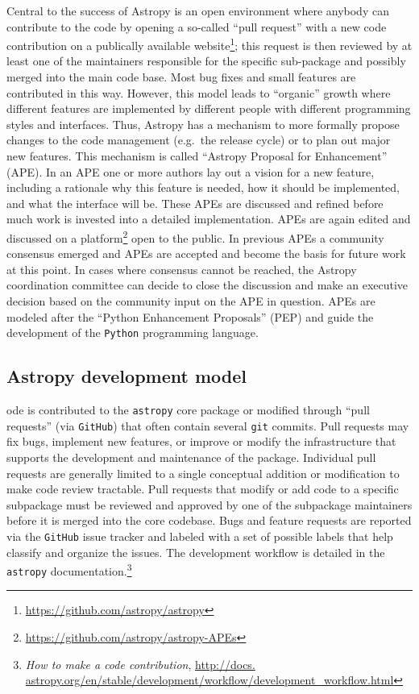 \documentclass[modern]{aastex61}
\newcommand{\package}[1]{\texttt{#1}\xspace}
\newcommand{\github}{\package{GitHub}}
\newcommand{\python}{\package{Python}}
\newcommand{\astropy}{Astropy\xspace}
\newcommand{\astropypkg}{\package{astropy}}
\newcommand{\inlinecomment}[2]{\todo[inline]{#1: #2}\xspace}
\begin{document}
Central to the success of \astropy is an open environment where
anybody can contribute to the code by opening a so-called ``pull
request'' with a new code contribution on a publically available
website\footnote{\url{https://github.com/astropy/astropy}}; this
request is then reviewed by at least one of the maintainers responsible for the specific
sub-package and possibly merged into the main code base. Most bug
fixes and small features are contributed in this way. However, this
model leads to ``organic'' growth where different features are
implemented by different people with different programming styles and
interfaces. Thus, \astropy has a mechanism to more formally propose
changes to the code management (e.g.~the release cycle) or to plan
out major new features. This mechanism is called ``Astropy Proposal
for Enhancement'' (APE). In an APE one or more authors lay out a
vision for a new feature, including a rationale why this feature is
needed, how it should be implemented, and what the interface will
be. These APEs are discussed and refined before much work is invested
into a detailed implementation. APEs are again edited and discussed on
a platform\footnote{\url{https://github.com/astropy/astropy-APEs}}
open to the public. In previous APEs a community consensus emerged and
APEs are accepted and become the basis for future work at this
point. In cases where consensus cannot be reached, the
\astropy coordination committee can decide to close the discussion and
make an executive decision based on the community input on the APE in
question. APEs are modeled after the ``Python Enhancement Proposals''
(PEP) and guide the development of the \python programming language.


\subsection{Astropy development model}
\inlinecomment{Adrian started this, but needs some filling in by EJT}

Code is contributed to the \astropypkg core package or modified through ``pull
requests'' (via \github) that often contain several \texttt{git} commits.
Pull requests may fix bugs, implement new features, or improve or modify the
infrastructure that supports the development and maintenance of the package.
Individual pull requests are generally limited to a single conceptual addition
or modification to make code review tractable.
Pull requests that modify or add code to a specific subpackage must be reviewed
and approved by one of the subpackage maintainers before it is merged into the
core codebase.
Bugs and feature requests are reported via the \github issue tracker and labeled
with a set of possible labels that help classify and organize the issues.
The development workflow is detailed in the \astropypkg
documentation.\footnote{\emph{How to make a code contribution}, \url{http://docs.
astropy.org/en/stable/development/workflow/development_workflow.html}}
\end{document}
